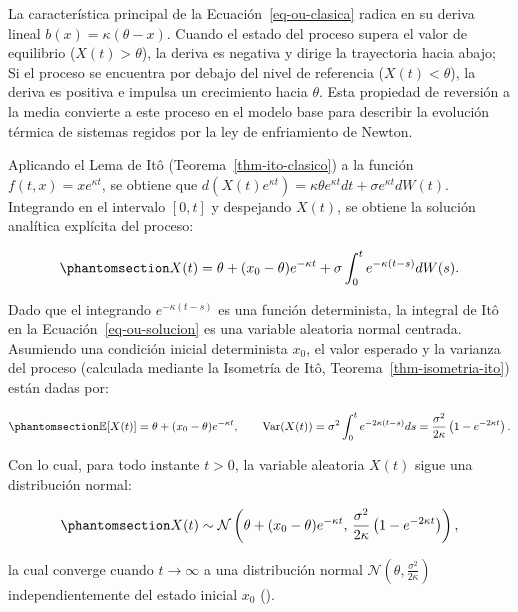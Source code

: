 \documentclass[
  spanish,
  us-letterpaper,
]{scrreprt}
\numberwithin{equation}{section}
\theoremstyle{plain}
\theoremstyle{plain}
\theoremstyle{plain}
\theoremstyle{definition}
\theoremstyle{remark}
\begin{document}
La característica principal de la Ecuación~\ref{eq-ou-clasica} radica en
su deriva lineal \(b(x) = \kappa(\theta - x)\). Cuando el estado del
proceso supera el valor de equilibrio (\(X(t) > \theta\)), la deriva es
negativa y dirige la trayectoria hacia abajo; Si el proceso se encuentra
por debajo del nivel de referencia (\(X(t) < \theta\)), la deriva es
positiva e impulsa un crecimiento hacia \(\theta\). Esta propiedad de
reversión a la media convierte a este proceso en el modelo base para
describir la evolución térmica de sistemas regidos por la ley de
enfriamiento de Newton.

Aplicando el Lema de Itô (Teorema~\ref{thm-ito-clasico}) a la función
\(f(t, x) = x e^{\kappa t}\), se obtiene que
\(d(X(t)e^{\kappa t}) = \kappa \theta e^{\kappa t} dt + \sigma e^{\kappa t} dW(t)\).
Integrando en el intervalo \([0, t]\) y despejando \(X(t)\), se obtiene
la solución analítica explícita del proceso:

\begin{equation}\phantomsection\label{eq-ou-solucion}{
X(t) = \theta + (x_0 - \theta)e^{-\kappa t} + \sigma \int_0^t e^{-\kappa(t-s)} dW(s).
}\end{equation}

Dado que el integrando \(e^{-\kappa(t-s)}\) es una función determinista,
la integral de Itô en la Ecuación~\ref{eq-ou-solucion} es una variable
aleatoria normal centrada. Asumiendo una condición inicial determinista
\(x_0\), el valor esperado y la varianza del proceso (calculada mediante
la Isometría de Itô, Teorema~\ref{thm-isometria-ito}) están dadas por:

\begin{equation}\phantomsection\label{eq-ou-moments}{
\mathbb{E}[X(t)] = \theta + (x_0 - \theta)e^{-\kappa t}, \qquad \text{Var}(X(t)) = \sigma^2 \int_0^t e^{-2\kappa(t-s)} ds = \frac{\sigma^2}{2\kappa}\left(1 - e^{-2\kappa t}\right).
}\end{equation}

Con lo cual, para todo instante \(t > 0\), la variable aleatoria
\(X(t)\) sigue una distribución normal:

\begin{equation}\phantomsection\label{eq-ou-distribucion}{
X(t) \sim \mathcal{N}\left( \theta + (x_0 - \theta)e^{-\kappa t}, \, \frac{\sigma^2}{2\kappa}\left(1 - e^{-2\kappa t}\right) \right),
}\end{equation}

la cual converge cuando \(t \to \infty\) a una distribución normal
\(\mathcal{N}\left(\theta, \frac{\sigma^2}{2\kappa}\right)\)
independientemente del estado inicial \(x_0\)
().
\end{document}
